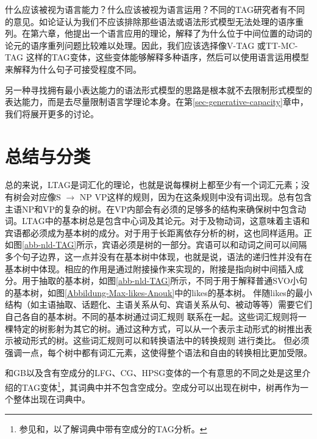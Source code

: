 什么应该被视为语言能力？什么应该被视为语言运用？不同的TAG研究者有不同的意见。如\citet[]{Rambow94a}论证认为我们不应该排除那些语法或语法形式模型无法处理的语序重列。在第六章，他提出一个语言应用的理论，解释了为什么位于中间位置的动词的论元的语序重列问题比较难以处理。因此，我们应该选择像V-TAG
或TT-MC-TAG
这样的TAG变体\citep{Lichte2007a}，这些变体能够解释多种语序，然后可以使用语言运用模型来解释为什么句子可接受程度不同。

另一种寻找拥有最小表达能力的语法形式模型的思路是根本就不去限制形式模型的表达能力，而是去尽量限制语言学理论本身。在第\ref{sec-generative-capacity}章中，我们将展开更多的讨论。 

\section{总结与分类}

总的来说，LTAG是词汇化的理论，也就是说每棵树上都至少有一个词汇元素；没有树会对应像S $\to$ NP VP这样的规则，因为在这条规则中没有词出现。总有包含主语NP和VP的复杂的树。在VP内部会有必须的足够多的结构来确保树中包含动词。LTAG中的基本树总是包含中心词及其论元。对于及物动词，这意味着主语和宾语都必须成为基本树的成分。对于用于长距离依存分析的树，这也同样适用。正如图\ref{abb-nld-TAG}所示，宾语必须是树的一部分。宾语可以和动词之间可以间隔多个句子边界，这一点并没有在基本树中体现，也就是说，语法的递归性并没有在基本树中体现。相应的作用是通过附接操作来实现的，附接是指向树中间插入成分。用于抽取的基本树，如图\ref{abb-nld-TAG}所示，不同于用于解释普通SVO小句的基本树，如图\ref{Abbildung-Max-likes-Anouk}中的likes的基本树。 伴随likes的最小结构（如主语抽取、话题化、主语关系从句、宾语关系从句、被动等等）需要它们自己各自的基本树\citep[]{KJ2003a}。不同的基本树通过词汇规则
联系在一起。这些词汇规则将一棵特定的树影射为其它的树。通过这种方式，可以从一个表示主动形式的树推出表示被动形式的树。这些词汇规则可以和转换语法中的转换规则
进行类比。 但必须强调一点，每个树中都有词汇元素，这使得整个语法和自由的转换相比更加受限。

和GB以及含有空成分的LFG、CG、HPSG变体的一个有意思的不同之处是这里介绍的TAG变体\footnote{%
  参见和，以了解词典中带有空成分的TAG分析。
}，其词典中并不包含空成分。空成分可以出现在树中，树再作为一个整体出现在词典中。

